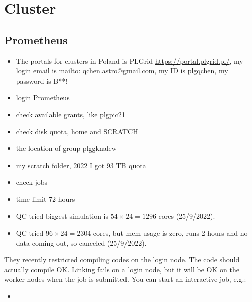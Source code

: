 \chapter{Cluster}

\section{Prometheus}
\begin{itemize}
\item The portals for clusters in Poland is PLGrid \url{https://portal.plgrid.pl/}, my login email is \url{mailto: qchen.astro@gmail.com}, my ID is plgqchen, my password is B**!
\item {} login Prometheus
\item {} check available grants, like plgpic21
\item {} check disk quota, home and SCRATCH
\item {} the location of group plggknalew
\item {} my scratch folder, 2022 I got 93 TB quota
\item {} check jobs
\item time limit 72 hours
\item QC tried biggest simulation is $54\times24=1296$ cores (25/9/2022).
\item QC tried $96\times24=2304$ cores, but mem usage is zero, runs 2 hours and no data coming out, so canceled (25/9/2022).
\end{itemize}

They recently restricted compiling codes on the login node. The code should actually compile OK. Linking fails on a login node, but it will be OK on the worker nodes when the job is submitted.
You can start an interactive job, e.g.:
\begin{itemize}
\item{}
\end{itemize}
